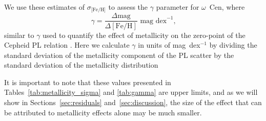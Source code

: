 \documentclass[a4paper,fleqn,usenatbib]{mnras}
\newcommand{\ocen}{$\omega$~Cen\xspace}
\begin{document}
We use these estimates of $\sigma_\text{[Fe/H]}$ to assess the $\gamma$ parameter for \ocen, where 
\begin{equation} \label{eqn:gamma}
\gamma = \dfrac {\Delta \text{mag}} {\Delta [\text{Fe/H}]}\text{ mag dex} ^{-1}\text{,}
\end{equation}
similar to $\gamma$ used to quantify the effect of metallicity on the zero-point of the Cepheid PL relation \citep{1998ApJ...498..181K, 2009MNRAS.396.1287S}. Here we calculate $\gamma$ in units of mag~dex$^{-1}$ by dividing the standard deviation of the metallicity component of the PL scatter by the standard deviation of the metallicity distribution %

It is important to note that these values presented in Tables~\ref{tab:metallicity_sigma} and \ref{tab:gamma} are upper limits, and as we will show in Sections~\ref{sec:residuals} and~\ref{sec:discussion}, the size of the effect that can be attributed to metallicity effects alone may be much smaller. 



\end{document}
